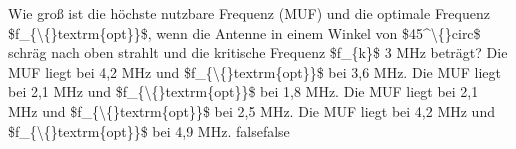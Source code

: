     {Wie groß ist die höchste nutzbare Frequenz (MUF) und die optimale Frequenz \$f\_\{\textbackslash\{\}textrm\{opt\}\}\$, wenn die Antenne in einem Winkel von \$45\textasciicircum{}\textbackslash\{\}circ\$ schräg nach oben strahlt und die kritische Frequenz \$f\_\{k\}\$ 3 MHz beträgt?}
    {Die MUF liegt bei 4,2 MHz und \$f\_\{\textbackslash\{\}textrm\{opt\}\}\$ bei 3,6 MHz.}
    {Die MUF liegt bei 2,1 MHz und \$f\_\{\textbackslash\{\}textrm\{opt\}\}\$ bei 1,8 MHz.}
    {Die MUF liegt bei 2,1 MHz und \$f\_\{\textbackslash\{\}textrm\{opt\}\}\$ bei 2,5 MHz.}
    {Die MUF liegt bei 4,2 MHz und \$f\_\{\textbackslash\{\}textrm\{opt\}\}\$ bei 4,9 MHz.}
    {false}{false}